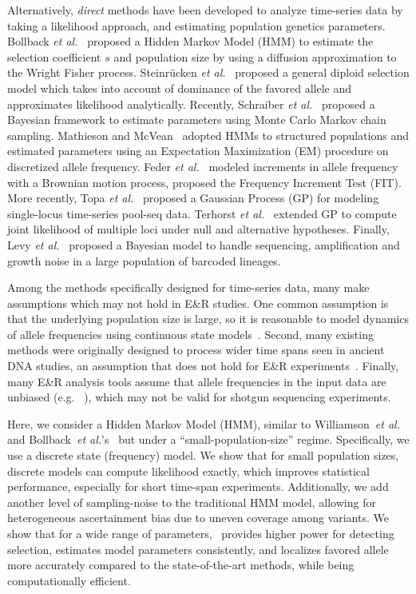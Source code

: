 Alternatively, \emph{direct} methods have been developed to analyze
time-series data by taking a likelihood approach, and estimating
population genetics parameters.  Bollback \emph{et
  al.}~\cite{bollback2008estimation} proposed a Hidden Markov Model
(HMM) to estimate the selection coefficient $s$ and population size by
using a diffusion approximation to the Wright Fisher 
process.  Steinr\"{u}cken \emph{et al.}~\cite{steinrucken2014novel}
proposed a general diploid selection model which takes into account of
dominance of the favored allele and approximates likelihood
analytically. Recently, Schraiber \emph{et
  al.}~\cite{schraiber2016bayesian} proposed a Bayesian framework to
estimate parameters using Monte Carlo Markov chain sampling. Mathieson
and McVean~\cite{mathieson2013estimating} adopted HMMs to structured
populations and estimated parameters using an Expectation Maximization
(EM) procedure on discretized allele frequency.  Feder \emph{et
  al.}~\cite{feder2014Identifying} modeled increments in allele
frequency with a Brownian motion process, proposed the Frequency
Increment Test (FIT). More recently, Topa \emph{et
  al.}~\cite{topa2015gaussian} proposed a Gaussian Process (GP) for
modeling single-locus time-series pool-seq data. Terhorst \emph{et
  al.}~\cite{Terhorst2015Multi} extended GP to compute joint
likelihood of multiple loci under null and alternative
hypotheses. Finally, Levy \emph{et al.}~\cite{levy2015quantitative} proposed a
Bayesian model to handle sequencing, amplification and growth noise in
a large population of barcoded lineages.



Among the methods specifically designed for time-series data, many
make assumptions which may not hold in E\&R studies. One common
assumption is that the underlying population size is large, so it is
reasonable to model dynamics of allele frequencies using continuous
state models~\cite{bollback2008estimation, feder2014Identifying,
  Terhorst2015Multi}. Second, many existing methods were originally
designed to process wider time spans seen in ancient DNA studies, an
assumption that does not hold for E\&R
experiments~\cite{steinrucken2014novel,
  schraiber2016bayesian}. Finally, many E\&R analysis tools assume
that allele frequencies in the input data are unbiased
(e.g. ~\cite{bollback2008estimation}), which may not be valid for
shotgun sequencing experiments.

Here, we consider a Hidden Markov Model (HMM), similar to
Williamson~\emph{et al.}~\cite{williamson1999using} and
Bollback~\emph{et al.}'s~\cite{bollback2008estimation} but under a
``small-population-size'' regime. Specifically, we use a discrete
state (frequency) model.  We show that for small population sizes,
discrete models can compute likelihood exactly, which improves
statistical performance, especially for short time-span
experiments. Additionally, we add another level of sampling-noise to
the traditional HMM model, allowing for heterogeneous ascertainment
bias due to uneven coverage among variants. We show that for a wide
range of parameters, \comale\ provides higher power for detecting
selection, estimates model parameters consistently, and localizes
favored allele more accurately compared to the state-of-the-art
methods, while being computationally efficient.
